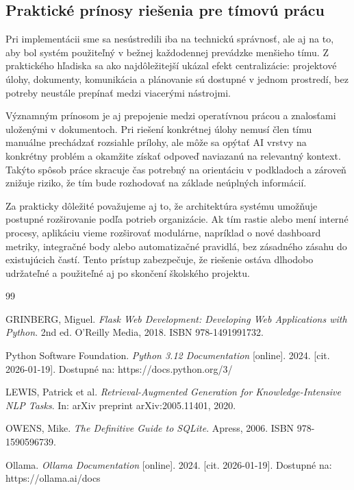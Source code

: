\documentclass[12pt, a4paper]{article}
\begin{document}
\begin{titlepage}
\subsection{Praktické prínosy riešenia pre tímovú prácu}
Pri implementácii sme sa nesústredili iba na technickú správnosť, ale aj na to, aby bol systém použiteľný v bežnej každodennej prevádzke menšieho tímu. Z praktického hľadiska sa ako najdôležitejší ukázal efekt centralizácie: projektové úlohy, dokumenty, komunikácia a plánovanie sú dostupné v jednom prostredí, bez potreby neustále prepínať medzi viacerými nástrojmi.

Významným prínosom je aj prepojenie medzi operatívnou prácou a znalosťami uloženými v dokumentoch. Pri riešení konkrétnej úlohy nemusí člen tímu manuálne prechádzať rozsiahle prílohy, ale môže sa opýtať AI vrstvy na konkrétny problém a okamžite získať odpoveď naviazanú na relevantný kontext. Takýto spôsob práce skracuje čas potrebný na orientáciu v podkladoch a zároveň znižuje riziko, že tím bude rozhodovať na základe neúplných informácií.

Za prakticky dôležité považujeme aj to, že architektúra systému umožňuje postupné rozširovanie podľa potrieb organizácie. Ak tím rastie alebo mení interné procesy, aplikáciu vieme rozširovať modulárne, napríklad o nové dashboard metriky, integračné body alebo automatizačné pravidlá, bez zásadného zásahu do existujúcich častí. Tento prístup zabezpečuje, že riešenie ostáva dlhodobo udržateľné a použiteľné aj po skončení školského projektu.

\newpage

\renewcommand\refname{ZOZNAM BIBLIOGRAFICKÝCH ODKAZOV}
\begin{thebibliography}{99}

GRINBERG, Miguel. \textit{Flask Web Development: Developing Web Applications with Python}. 2nd ed. O'Reilly Media, 2018. ISBN 978-1491991732.

Python Software Foundation. \textit{Python 3.12 Documentation} [online]. 2024. [cit. 2026-01-19]. Dostupné na: https://docs.python.org/3/

LEWIS, Patrick et al. \textit{Retrieval-Augmented Generation for Knowledge-Intensive NLP Tasks}. In: arXiv preprint arXiv:2005.11401, 2020.

OWENS, Mike. \textit{The Definitive Guide to SQLite}. Apress, 2006. ISBN 978-1590596739.

Ollama. \textit{Ollama Documentation} [online]. 2024. [cit. 2026-01-19]. Dostupné na: https://ollama.ai/docs


\end{thebibliography}
\end{titlepage}
\end{document}
